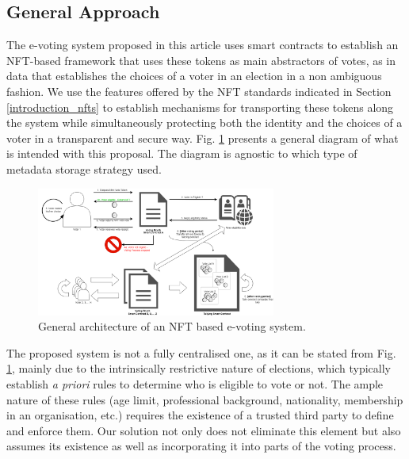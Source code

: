 \documentclass[../main.tex]{subfiles}
\begin{document}
   
    \subsection{General Approach}
    The e-voting system proposed in this article uses smart contracts to establish an NFT-based framework that uses these tokens as main abstractors of votes, as in data that establishes the choices of a voter in an election in a non ambiguous fashion. We use the features offered by the NFT standards indicated in Section \ref{introduction_nfts} to establish mechanisms for transporting these tokens along the system while simultaneously protecting both the identity and the choices of a voter in a transparent and secure way. Fig. \ref{fig:general_architecture} presents a general diagram of what is intended with this proposal. The diagram is agnostic to which type of metadata storage strategy used.

    \begin{figure}[htp]
        \centering
        \includegraphics[width=0.7\textwidth]{../Images/01_general_solution.png}
        \caption{General architecture of an NFT based e-voting system.}
        \label{fig:general_architecture}
    \end{figure}

    The proposed system is not a fully centralised one, as it can be stated from Fig. \ref{fig:general_architecture}, mainly due to the intrinsically restrictive nature of elections, which typically establish \textit{a priori} rules to determine who is eligible to vote or not. The ample nature of these rules (age limit, professional background, nationality, membership in an organisation, etc.) requires the existence of a trusted third party to define and enforce them. Our solution not only does not eliminate this element but also assumes its existence as well as incorporating it into parts of the voting process.
\end{document}
